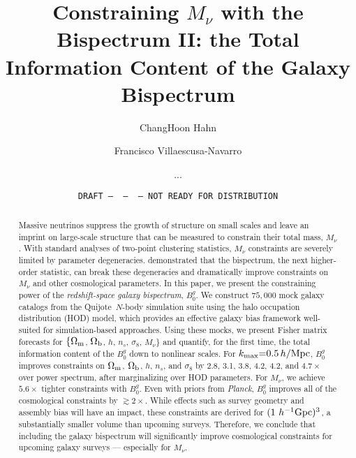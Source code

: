 \documentclass[12pt, letterpaper, preprint]{aastex63}
\newcommand{\Om}{\Omega_{\rm m}}
\newcommand{\Ob}{\Omega_{\rm b}}
\newcommand{\smnu}{M_\nu}
\newcommand{\sig}{\sigma_8}
\newcommand{\hmpc}{\,h/\mathrm{Mpc}}
\newcommand{\quij}{{\sc Quijote}}
\newcommand{\planck}{{\em Planck}}
\newcommand{\kmax}{k_{\rm max}}
\newcommand{\Bg}{B^g_0}
\begin{document}

\title{Constraining $\smnu$ with the Bispectrum II: the Total Information Content of the Galaxy Bispectrum} 
\date{\texttt{DRAFT~---~\githash~---~\gitdate~---~NOT READY FOR DISTRIBUTION}}

\author{ChangHoon Hahn}

\author{Francisco Villaescusa-Navarro} 

\author{...}

\begin{abstract}
    Massive neutrinos suppress the growth of structure on small scales %
    and leave an imprint on large-scale structure that can be measured to
    constrain their total mass, $\smnu$. With standard analyses of two-point
    clustering statistics, $\smnu$ constraints are severely limited by parameter
    degeneracies. \cite{hahn2020} demonstrated that the bispectrum, the
    next higher-order statistic, can break these degeneracies and dramatically
    improve constraints on $\smnu$ and other cosmological parameters. In this
    paper, we present the constraining power of the {\em redshift-space galaxy 
    bispectrum}, $\Bg$. We construct $75,000$ mock galaxy catalogs from the
    \quij~$N$-body simulation suite using the halo occupation distribution (HOD) model,
    which provides an effective galaxy bias framework well-suited for simulation-based
    approaches. Using these mocks, we present Fisher matrix forecasts for 
    $\{\Om$, $\Ob$, $h$, $n_s$, $\sig$, $\smnu\}$ and
    quantify, for the first time, the total information content of the $\Bg$
    down to nonlinear scales. For $\kmax{=}0.5\hmpc$, $\Bg$ improves constraints 
    on $\Om$, $\Ob$, $h$, $n_s$, and $\sig$ by 2.8, 3.1, 3.8, 4.2, 4.2, and $4.7{\times}$ 
    over power spectrum, after marginalizing over HOD parameters. For $\smnu$, 
    we achieve $5.6\times$ tighter constraints with $\Bg$. Even with priors from
    \planck, $\Bg$ improves all of the cosmological constraints by $\gtrsim 2\times$. 
    While effects such as survey geometry and assembly bias will have an
    impact, these %
    constraints are derived for $(1~h^{-1}{\rm Gpc})^3$, a substantially
    smaller volume than upcoming surveys. Therefore, we conclude that including
    the galaxy bispectrum will significantly improve cosmological constraints
    for upcoming galaxy surveys --- especially for $\smnu$. \vspace{1cm}
\end{abstract}
\end{document}
